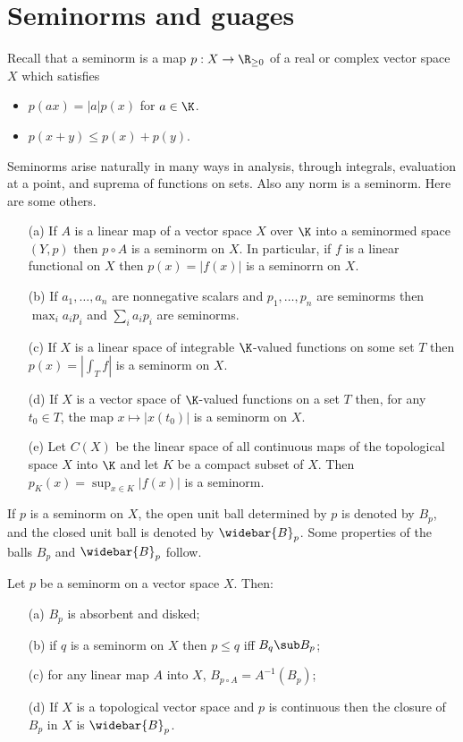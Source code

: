 \section{Seminorms and guages}
Recall that a seminorm is a map $p:X\to\R_{\geq 0}$ of a real or complex vector space $X$ which satisfies
\begin{itemize}
\item $p(ax)=|a|p(x)$ for $a\in\K$.
\item $p(x+y)\leq p(x)+p(y)$.
\end{itemize}
Seminorms arise naturally in many ways in analysis, through integrals, evaluation at a point, and suprema of functions on sets. Also any norm is a seminorm. Here are some others.
\begin{example}\label{seminorm eg}
\mbox{}
\begin{itemize}
\item[(a)] If $A$ is a linear map of a vector space $X$ over $\K$ into a seminormed space $(Y,p)$ then $p\circ A$ is a seminorm on $X$. In particular, if $f$ is a linear functional on $X$ then $p(x)=|f(x)|$ is a seminorrn on $X$.
\item[(b)] If $a_1,\dots,a_n$ are nonnegative scalars and $p_1,\dots,p_n$ are seminorms then $\max_ia_ip_i$ and $\sum_ia_ip_i$ are seminorms.
\item[(c)] If $X$ is a linear space of integrable $\K$-valued functions on some set $T$ then $p(x)=|\int_Tf|$ is a seminorm on $X$.
\item[(d)] If $X$ is a vector space of $\K$-valued functions on a set $T$ then, for any $t_0\in T$, the map $x\mapsto|x(t_0)|$ is a seminorm on $X$.
\item[(e)] Let $C(X)$ be the linear space of all continuous maps of the topological space $X$ into $\K$ and let $K$ be a compact subset of $X$. Then $p_K(x)=\sup_{x\in K}|f(x)|$ is a seminorm.
\end{itemize}
\end{example}
If $p$ is a seminorm on $X$, the open unit ball determined by $p$ is denoted by $B_p$, and the closed unit ball is denoted by $\widebar{B}_p$. Some properties of the balls $B_p$ and $\widebar{B}_p$ follow.
\begin{proposition}\label{seminorm prop}
Let $p$ be a seminorm on a vector space $X$. Then:
\begin{itemize}
\item[(a)] $B_p$ is absorbent and disked;
\item[(b)] if $q$ is a seminorm on $X$ then $p\leq q$ iff $B_q\sub B_p$;
\item[(c)] for any linear map $A$ into $X$, $B_{p\circ A}=A^{-1}(B_p)$;
\item[(d)] If $X$ is a topological vector space and $p$ is continuous then the closure of $B_p$ in $X$ is $\widebar{B}_p$.
\end{itemize}
\end{proposition}
